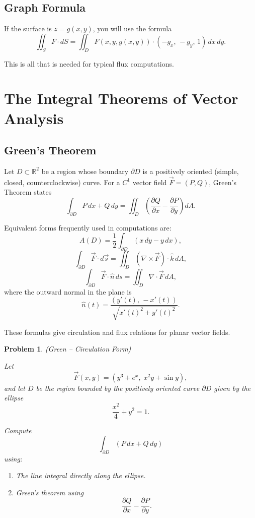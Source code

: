 \documentclass{article}
\newtheorem{problem}{Problem}
\begin{document}
\subsection{Graph Formula}
If the surface is \(z = g(x,y)\), you will use the formula
\[
\iint_S F \cdot dS
=
\iint_D F(x,y,g(x,y)) \cdot (-g_x,\,-g_y,\,1)\, dx\, dy.
\]

This is all that is needed for typical flux computations.

\section{The Integral Theorems of Vector Analysis}

\subsection{Green's Theorem}

Let \(D \subset \mathbb{R}^2\) be a region whose boundary \(\partial D\) is a positively oriented
(simple, closed, counterclockwise) curve.  
For a \(C^1\) vector field \(\vec{F} = (P,Q)\), Green's Theorem states
\[
\int_{\partial D} P\,dx + Q\,dy
=
\iint_D \left( \frac{\partial Q}{\partial x}
              - \frac{\partial P}{\partial y} \right) dA .
\]

Equivalent forms frequently used in computations are:
\[
A(D)
=
\frac{1}{2}\int_{\partial D} (x\,dy - y\,dx),
\]
\[
\int_{\partial D} \vec{F} \cdot d\vec{s}
=
\iint_D (\nabla \times \vec{F})\cdot \hat{k} \, dA,
\]
\[
\int_{\partial D} \vec{F}\cdot \hat{n}\, ds
=
\iint_D \nabla \cdot \vec{F}\, dA,
\]
where the outward normal in the plane is
\[
\hat{n}(t) = \frac{(y'(t),\, -x'(t))}{\sqrt{x'(t)^2 + y'(t)^2}}.
\]

These formulas give circulation and flux relations for planar vector fields.

\begin{problem}
(Green -- Circulation Form)

Let 
\[
\vec{F}(x,y) = (y^3 + e^x,\; x^2 y + \sin y),
\]
and let $D$ be the region bounded by the positively oriented curve $\partial D$ given by the ellipse
\[
\frac{x^2}{4} + y^2 = 1.
\]

Compute
\[
\int_{\partial D} (P\,dx + Q\,dy)
\]
using:

\begin{enumerate}
    \item The line integral directly along the ellipse.
    \item Green's theorem using
    \[
    \frac{\partial Q}{\partial x} - \frac{\partial P}{\partial y}.
    \]
\end{enumerate}
\end{problem}
\end{document}
